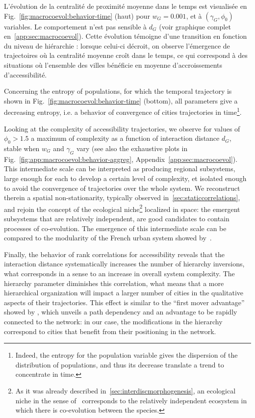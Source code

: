 L'évolution de la centralité de proximité moyenne dans le temps est visualisée en Fig.~\ref{fig:macrocoevol:behavior-time} (haut) pour $w_G = 0.001$, et à $(\gamma_G,\phi_0)$ variables. Le comportement n'est pas sensible à $d_G$ (voir graphique complet en~\ref{app:sec:macrocoevol}). Cette évolution témoigne d'une transition en fonction du niveau de hiérarchie : lorsque celui-ci décroit, on observe l'émergence de trajectoires où la centralité moyenne croît dans le temps, ce qui correspond à des situations où l'ensemble des villes bénéficie en moyenne d'accroissements d'accessibilité.


Concerning the entropy of populations, for which the temporal trajectory is shown in Fig.~\ref{fig:macrocoevol:behavior-time} (bottom), all parameters give a decreasing entropy, i.e. a behavior of convergence of cities trajectories in time\footnote{Indeed, the entropy for the population variable gives the dispersion of the distribution of populations, and thus its decrease translate a trend to concentrate in time.}.


Looking at the complexity of accessibility trajectories, we observe for values of $\phi_0 > 1.5$ a maximum of complexity as a function of interaction distance $d_G$, stable when $w_G$ and $\gamma_G$ vary (see also the exhaustive plots in Fig.~\ref{fig:app:macrocoevol:behavior-aggreg}, Appendix~\ref{app:sec:macrocoevol}). This intermediate scale can be interpreted as producing regional subsystems, large enough for each to develop a certain level of complexity, et isolated enough to avoid the convergence of trajectories over the whole system. We reconstruct therein a spatial non-stationarity, typically observed in~\ref{sec:staticcorrelations}, and rejoin the concept of the ecological niche\footnote{As it was already described in~\ref{sec:interdiscmorphogenesis}, an ecological niche in the sense of~\cite{holland2012signals} corresponds to the relatively independent ecosystem in which there is co-evolution between the species.} localized in space: the emergent subsystems that are relatively independent, are good candidates to contain processes of co-evolution. The emergence of this intermediate scale can be compared to the modularity of the French urban system showed by~\cite{berroir2017systemes}.



Finally, the behavior of rank correlations for accessibility reveals that the interaction distance systematically increases the number of hierarchy inversions, what corresponds in a sense to an increase in overall system complexity. The hierarchy parameter diminishes this correlation, what means that a more hierarchical organization will impact a larger number of cities in the qualitative aspects of their trajectories. This effect is similar to the ``first mover advantage'' showed by \cite{levinson2011does}, which unveils a path dependency and an advantage to be rapidly connected to the network: in our case, the modifications in the hierarchy correspond to cities that benefit from their positioning in the network.



